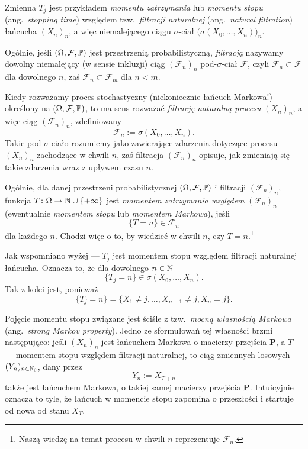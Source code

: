 \documentclass[dvipsnames]{book}
\begin{document}
\begin{uwaga}
Zmienna $T_j$ jest przykładem \emph{momentu zatrzymania} lub \emph{momentu
stopu} (ang.\ \emph{stopping time}) względem tzw.\ \emph{filtracji naturalnej}
(ang.\ \emph{natural filtration}) łańcucha $(X_n)_n$, a więc niemalejącego
ciągu $\sigma$-ciał $\big(\sigma(X_0, \ldots, X_n)\big)_n$.

Ogólnie, jeśli $(\Omega, \mathcal{F}, \P)$ jest przestrzenią probabilistyczną,
\emph{filtracją} nazywamy dowolny niemalejący (w sensie inkluzji) ciąg
$(\mathcal{F}_n)_n$ pod-$\sigma$-ciał $\mathcal{F}$, czyli
$\mathcal{F}_n \subset \mathcal{F}$ dla dowolnego $n$, zaś
$\mathcal{F}_n \subset \mathcal{F}_m$ dla $n < m$.

Kiedy rozważamy proces stochastyczny (niekoniecznie łańcuch Markowa!)
określony na $(\Omega, \mathcal{F}, \P)$, to ma sens rozważać \emph{filtrację
naturalną procesu} $(X_n)_n$, a więc ciąg $(\mathcal{F}_n)_n$, zdefiniowany
\[
  \mathcal{F}_n := \sigma(X_0, \ldots, X_n).
\]
Takie pod-$\sigma$-ciało rozumiemy jako zawierające zdarzenia dotyczące procesu
$(X_n)_n$ zachodzące w chwili $n$, zaś filtracja $(\mathcal{F}_n)_n$ opisuje,
jak zmieniają się takie zdarzenia wraz z upływem czasu $n$.

Ogólnie, dla danej przestrzeni probabilistycznej $(\Omega, \mathcal{F}, \P)$
i filtracji $(\mathcal{F}_n)_n$, funkcja
$T \colon \Omega \to \N \cup \{+\infty\}$ jest \emph{momentem zatrzymania
względem} $(\mathcal{F}_n)_n$ (ewentualnie \emph{momentem stopu} lub
\emph{momentem Markowa}), jeśli
\[
  \{T = n\} \in \mathcal{F}_n
\]
dla każdego $n$. Chodzi więc o to, by wiedzieć w chwili $n$, czy
$T = n$.\footnote{Naszą wiedzę na temat procesu w chwili $n$ reprezentuje
$\mathcal{F}_n$.}

Jak wspomniano wyżej --- $T_j$ jest momentem stopu względem filtracji naturalnej
łańcucha. Oznacza to, że dla dowolnego $n \in \N$
\[
  \{T_j = n\} \in \sigma(X_0, \ldots, X_n).
\]
Tak z kolei jest, ponieważ
\[
  \{T_j = n\} = \{X_1 \neq j, \ldots, X_{n-1} \neq j, X_n = j\}.
\]
\end{uwaga}

\begin{uwaga}
Pojęcie momentu stopu związane jest ściśle z tzw.\ \emph{mocną własnością
Markowa} (ang.\ \emph{strong Markov property}). Jedno ze sformułowań tej
własności brzmi następująco: jeśli $(X_n)_n$ jest łańcuchem Markowa o macierzy
przejścia $\mathbf{P}$, a $T$ --- momentem stopu względem filtracji naturalnej,
to ciąg zmiennych losowych $(Y_n)_{n \in \N_0}$, dany przez
\[
  Y_n := X_{T+n}
\]
także jest łańcuchem Markowa, o takiej samej macierzy przejścia $\mathbf{P}$.
Intuicyjnie oznacza to tyle, że łańcuch w momencie stopu zapomina o przeszłości
i startuje od nowa od stanu $X_T$.
\end{uwaga}
\end{document}
